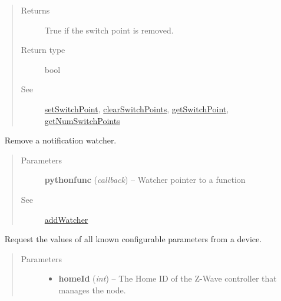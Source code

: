 \documentclass[letterpaper,10pt,english]{sphinxmanual}
\begin{document}
\begin{fulllineitems}
\begin{fulllineitems}
\begin{quote}
\begin{description}
\begin{itemize}
\end{itemize}

\item[{Returns}] \leavevmode
True if the switch point is removed.

\item[{Return type}] \leavevmode
bool

\item[{See}] \leavevmode
{\hyperref[libopenzwave:setswitchpoint]{setSwitchPoint}}, {\hyperref[libopenzwave:clearswitchpoints]{clearSwitchPoints}}, {\hyperref[libopenzwave:getswitchpoint]{getSwitchPoint}}, {\hyperref[libopenzwave:getnumswitchpoints]{getNumSwitchPoints}}

\end{description}\end{quote}

\end{fulllineitems}


\begin{fulllineitems}
\label{libopenzwave:libopenzwave.PyManager.removeWatcher}~\label{libopenzwave:removewatcher}
Remove a notification watcher.
\begin{quote}\begin{description}
\item[{Parameters}] \leavevmode
\textbf{pythonfunc} (\emph{callback}) -- Watcher pointer to a function

\item[{See}] \leavevmode
{\hyperref[libopenzwave:addwatcher]{addWatcher}}

\end{description}\end{quote}

\end{fulllineitems}


\begin{fulllineitems}
\label{libopenzwave:libopenzwave.PyManager.requestAllConfigParams}~\label{libopenzwave:requestallconfigparams}
Request the values of all known configurable parameters from a device.
\begin{quote}\begin{description}
\item[{Parameters}] \leavevmode\begin{itemize}
\item {} 
\textbf{homeId} (\emph{int}) -- The Home ID of the Z-Wave controller that manages the node.


\end{itemize}
\end{description}
\end{quote}
\end{fulllineitems}
\end{fulllineitems}
\end{document}
